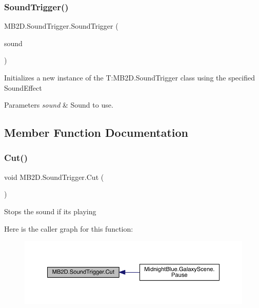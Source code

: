 \subsubsection{\texorpdfstring{Sound\+Trigger()}{SoundTrigger()}}
{\footnotesize\ttfamily M\+B2\+D.\+Sound\+Trigger.\+Sound\+Trigger (\begin{DoxyParamCaption}\item[{Sound\+Effect}]{sound }\end{DoxyParamCaption})\hspace{0.3cm}{\ttfamily [inline]}}



Initializes a new instance of the T\+:\+M\+B2\+D.\+Sound\+Trigger class using the specified Sound\+Effect 


\begin{DoxyParams}{Parameters}
{\em sound} & Sound to use.\\
\hline
\end{DoxyParams}


\subsection{Member Function Documentation}
\hypertarget{class_m_b2_d_1_1_sound_trigger_ae8846b39ac8469f479f8d64cbec25a11}{}\label{class_m_b2_d_1_1_sound_trigger_ae8846b39ac8469f479f8d64cbec25a11} 
\subsubsection{\texorpdfstring{Cut()}{Cut()}}
{\footnotesize\ttfamily void M\+B2\+D.\+Sound\+Trigger.\+Cut (\begin{DoxyParamCaption}{ }\end{DoxyParamCaption})\hspace{0.3cm}{\ttfamily [inline]}}



Stops the sound if it\textquotesingle{}s playing 

Here is the caller graph for this function\+:\nopagebreak
\begin{figure}[H]
\begin{center}
\leavevmode
\includegraphics[width=350pt]{class_m_b2_d_1_1_sound_trigger_ae8846b39ac8469f479f8d64cbec25a11_icgraph}
\end{center}
\end{figure}
\hypertarget{class_m_b2_d_1_1_sound_trigger_aca40e191ef7b6cd594d43bb36ae787e9}{}\label{class_m_b2_d_1_1_sound_trigger_aca40e191ef7b6cd594d43bb36ae787e9} 
